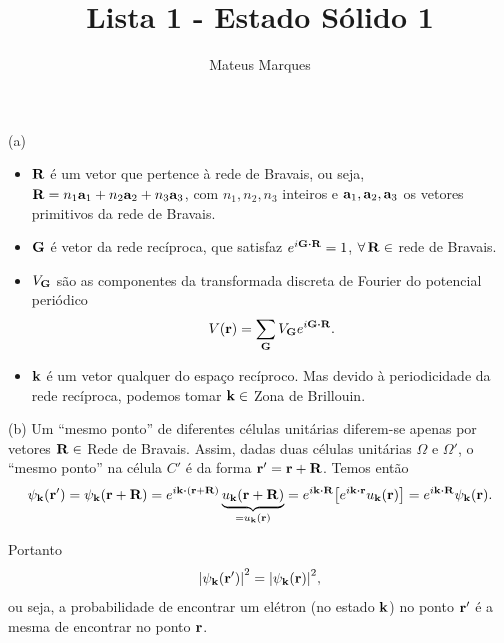 \documentclass[a4paper,10pt]{article}
\title{\Huge{\textbf{Lista 1 - Estado Sólido 1}}}
\author{Mateus Marques}
\begin{document}
\maketitle

\section{}

(a)
\begin{itemize}
\item ${\vb{R}}$ é um vetor que pertence à rede de Bravais, ou seja, ${\vb{R}} = n_1 \vb{a}_1 + n_2 \vb{a}_2 + n_3 \vb{a}_3$, com $n_1,n_2,n_3$
inteiros e $\vb{a}_1,\vb{a}_2,\vb{a}_3$ os vetores primitivos da rede de Bravais.

\item ${\vb{G}}$ é vetor da rede recíproca, que satisfaz $e^{i \G \vdot \R} = 1$, $\forall \, {\vb{R}} \in$ rede de Bravais.

\item $V_{{\vb{G}}}$ são as componentes da transformada discreta de Fourier do potencial periódico
$$
V(\r) = \sum_{\G} V_{\G} e^{i \G \vdot \R}.
$$

\item ${\vb{k}}$ é um vetor qualquer do espaço recíproco. Mas devido à periodicidade da rede recíproca, podemos tomar ${\vb{k}} \in$ Zona de Brillouin.

\end{itemize}


(b) Um ``mesmo ponto'' de diferentes células unitárias diferem-se apenas por vetores ${\vb{R}} \in$ Rede de Bravais. Assim, dadas duas células unitárias $\Omega$ e $\Omega'$, o ``mesmo ponto'' na célula $C'$ é da forma ${\vb{r}}' = {\vb{r}} + {\vb{R}}$. Temos então
$$
\psi_\k(\r') = \psi_\k(\r+\R) = e^{i \k \vdot (\r+\R)} \underbrace{u_\k(\r+\R)}_{=u_\k(\r)} =
e^{i \k \vdot \R} \qty[e^{i\k\vdot\r} u_\k(\r)] = e^{i\k\vdot\R} \psi_\k(\r).
$$

Portanto
$$
\abs{\psi_{\vb{k}}({\vb{r}}')}^2 = \abs{\psi_{\vb{k}}({\vb{r}})}^2,
$$
ou seja, a probabilidade de encontrar um elétron (no estado ${\vb{k}}$) no ponto ${\vb{r}}'$ é a mesma de encontrar no ponto ${\vb{r}}$.


\pagebreak

\section{}
\end{document}
